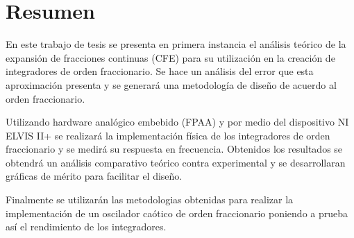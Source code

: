 \chapter{Resumen}


	En este trabajo de tesis se presenta en primera instancia el análisis teórico de la expansión de fracciones continuas (CFE) para su utilización en la creación de integradores de orden fraccionario. Se hace un análisis del error que esta aproximación presenta y se generará una metodología de diseño de acuerdo al orden fraccionario.
	
	Utilizando hardware analógico embebido (FPAA) y por medio del dispositivo NI ELVIS II+ se realizará la implementación física de los integradores de orden fraccionario y se medirá su respuesta en frecuencia. Obtenidos los resultados se obtendrá un análisis comparativo teórico contra experimental y se desarrollaran gráficas de mérito para facilitar el diseño.
	
	Finalmente se utilizarán las metodologias obtenidas para realizar la implementación de un oscilador caótico de orden fraccionario poniendo a prueba así el rendimiento de los integradores.